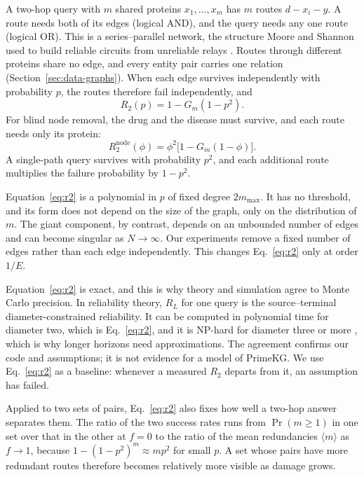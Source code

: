 A two-hop query with $m$ shared proteins $x_1,\dots,x_m$ has $m$ routes
$d\!-\!x_i\!-\!y$. A route needs both of its edges (logical AND), and the query
needs any one route (logical OR). This is a series--parallel network, the
structure Moore and Shannon used to build reliable circuits from unreliable
relays \cite{moore1956reliable}. Routes through different proteins share no edge,
and every entity pair carries one relation (Section~\ref{sec:data-graphs}). When
each edge survives independently with probability $p$, the routes therefore
fail independently, and
\begin{equation}
R_2(p)=1-G_m(1-p^2).
\label{eq:r2}
\end{equation}
For blind node removal, the drug and the disease must survive, and each route
needs only its protein:
\begin{equation}
R_2^{\mathrm{node}}(\phi)=\phi^2\bigl[1-G_m(1-\phi)\bigr].
\label{eq:r2-node}
\end{equation}
A single-path query survives with probability $p^2$, and each additional route
multiplies the failure probability by $1-p^2$.

Equation~\eqref{eq:r2} is a polynomial in $p$ of fixed degree $2m_{\max}$. It has
no threshold, and its form does not depend on the size of the graph, only on the
distribution of $m$. The giant component, by
contrast, depends on an unbounded number of edges and can become singular as
$N\to\infty$. Our experiments remove a fixed number of edges rather than each
edge independently. This changes Eq.~\eqref{eq:r2} only at order $1/E$.

Equation~\eqref{eq:r2} is exact, and this is why theory and simulation agree to
Monte Carlo precision. In reliability theory, $R_L$ for one query is the
source--terminal diameter-constrained reliability. It can be computed in
polynomial time for diameter two, which is Eq.~\eqref{eq:r2}, and it is NP-hard
for diameter three or more \cite{canale2014diameter}, which is why longer
horizons need approximations. The agreement confirms our code and assumptions;
it is not evidence for a model of PrimeKG. We use Eq.~\eqref{eq:r2} as a
baseline: whenever a measured $R_2$ departs from it, an assumption has failed.

Applied to two sets of pairs, Eq.~\eqref{eq:r2} also fixes how well a two-hop
answer separates them. The ratio of the two success rates runs from
$\Pr(m\ge1)$ in one set over that in the other at $f=0$ to the ratio of the
mean redundancies $\langle m\rangle$ as $f\to1$, because
$1-(1-p^2)^m\approx mp^2$ for small $p$. A set whose pairs have more redundant
routes therefore becomes relatively more visible as damage grows.

